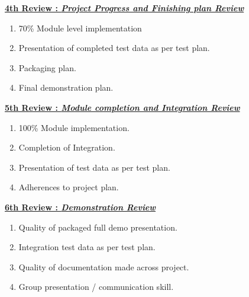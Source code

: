 \textbf {\underline{4th Review :  \textit{Project Progress and Finishing plan Review}}}
\begin{enumerate}
\item 70\% Module level implementation 
\item Presentation of completed test data as per test plan.
\item Packaging plan.
\item Final demonstration plan.
\end{enumerate}

\textbf {\underline{5th Review :  \textit{Module completion and Integration Review}}}
\begin{enumerate}
\item 100\% Module implementation.
\item Completion of Integration.
\item Presentation of test data as per test plan.
\item Adherences to project plan.
\end{enumerate}

\textbf {\underline{6th Review :  \textit{Demonstration Review }}}
\begin{enumerate}
\item Quality of packaged full demo presentation. 
\item Integration test data as per test plan.
\item Quality of documentation made across project.
\item Group presentation / communication skill. 
\end{enumerate}



